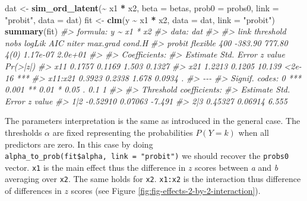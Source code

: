 \documentclass[
  man,floatsintext]{apa6}
\newenvironment{Shaded}{\begin{snugshade}}{\end{snugshade}}
\newcommand{\AttributeTok}[1]{\textcolor[rgb]{0.13,0.29,0.53}{#1}}
\newcommand{\CommentTok}[1]{\textcolor[rgb]{0.56,0.35,0.01}{\textit{#1}}}
\newcommand{\FunctionTok}[1]{\textcolor[rgb]{0.13,0.29,0.53}{\textbf{#1}}}
\newcommand{\NormalTok}[1]{#1}
\newcommand{\OtherTok}[1]{\textcolor[rgb]{0.56,0.35,0.01}{#1}}
\newcommand{\SpecialCharTok}[1]{\textcolor[rgb]{0.81,0.36,0.00}{\textbf{#1}}}
\newcommand{\StringTok}[1]{\textcolor[rgb]{0.31,0.60,0.02}{#1}}
\begin{document}
\begin{Shaded}
\begin{Highlighting}[]
\NormalTok{dat }\OtherTok{\textless{}{-}} \FunctionTok{sim\_ord\_latent}\NormalTok{(}\SpecialCharTok{\textasciitilde{}}\NormalTok{ x1 }\SpecialCharTok{*}\NormalTok{ x2, }\AttributeTok{beta =}\NormalTok{ betas, }\AttributeTok{prob0 =}\NormalTok{ probs0, }\AttributeTok{link =} \StringTok{"probit"}\NormalTok{, }\AttributeTok{data =}\NormalTok{ dat)}
\NormalTok{fit }\OtherTok{\textless{}{-}} \FunctionTok{clm}\NormalTok{(y }\SpecialCharTok{\textasciitilde{}}\NormalTok{ x1 }\SpecialCharTok{*}\NormalTok{ x2, }\AttributeTok{data =}\NormalTok{ dat, }\AttributeTok{link =} \StringTok{"probit"}\NormalTok{)}
\FunctionTok{summary}\NormalTok{(fit)}
\CommentTok{\#\textgreater{} formula: y \textasciitilde{} x1 * x2}
\CommentTok{\#\textgreater{} data:    dat}
\CommentTok{\#\textgreater{} }
\CommentTok{\#\textgreater{}  link   threshold nobs logLik  AIC    niter max.grad cond.H }
\CommentTok{\#\textgreater{}  probit flexible  400  {-}383.90 777.80 4(0)  1.17e{-}07 2.0e+01}
\CommentTok{\#\textgreater{} }
\CommentTok{\#\textgreater{} Coefficients:}
\CommentTok{\#\textgreater{}         Estimate Std. Error z value Pr(\textgreater{}|z|)    }
\CommentTok{\#\textgreater{} x11       0.1757     0.1169   1.503   0.1327    }
\CommentTok{\#\textgreater{} x21       1.2213     0.1205  10.139   \textless{}2e{-}16 ***}
\CommentTok{\#\textgreater{} x11:x21   0.3923     0.2338   1.678   0.0934 .  }
\CommentTok{\#\textgreater{} {-}{-}{-}}
\CommentTok{\#\textgreater{} Signif. codes:  0 \textquotesingle{}***\textquotesingle{} 0.001 \textquotesingle{}**\textquotesingle{} 0.01 \textquotesingle{}*\textquotesingle{} 0.05 \textquotesingle{}.\textquotesingle{} 0.1 \textquotesingle{} \textquotesingle{} 1}
\CommentTok{\#\textgreater{} }
\CommentTok{\#\textgreater{} Threshold coefficients:}
\CommentTok{\#\textgreater{}     Estimate Std. Error z value}
\CommentTok{\#\textgreater{} 1|2 {-}0.52910    0.07063  {-}7.491}
\CommentTok{\#\textgreater{} 2|3  0.45327    0.06914   6.555}
\end{Highlighting}
\end{Shaded}

\normalsize

The parameters interpretation is the same as introduced in the general case. The thresholds \(\alpha\) are fixed representing the probabilities \(P(Y = k)\) when all predictors are zero. In this case by doing \texttt{alpha\_to\_prob(fit\$alpha,\ link\ =\ "probit")} we should recover the \texttt{probs0} vector. \texttt{x1} is the main effect thus the difference in \(z\) scores between \emph{a} and \emph{b} averaging over \texttt{x2}. The same holds for \texttt{x2}. \texttt{x1:x2} is the interaction thus difference of differences in \(z\) scores (see Figure \ref{fig:fig-effects-2-by-2-interaction}).
\end{document}
